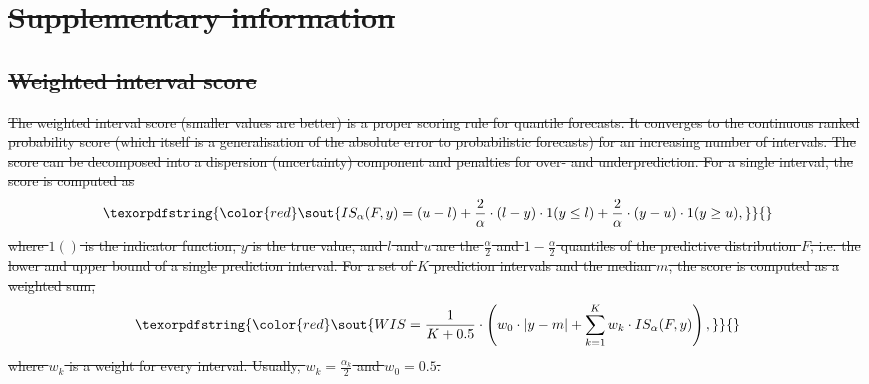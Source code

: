 \documentclass[10pt,a4paper,twocolumn]{article}
\providecommand{\DIFdeltex}[1]{{\protect\color{red}\sout{#1}}}                      %
\providecommand{\DIFdelbegin}{} %
\providecommand{\DIFdelend}{} %
\providecommand{\DIFdel}[1]{\texorpdfstring{\DIFdeltex{#1}}{}} %
\begin{document}
\section*{\DIFdel{Supplementary information}}
\DIFdelend %

\DIFdelbegin \subsection*{\DIFdel{Weighted interval score}}
\DIFdelend %


\DIFdelbegin \DIFdel{The weighted interval score (smaller values are better) is a proper scoring rule for quantile forecasts. It converges to the continuous ranked probability score (which itself is a generalisation of the absolute error to probabilistic forecasts) for an increasing number of intervals. The score can be decomposed into a dispersion (uncertainty) component and penalties for over- and underprediction. For a single interval, the score is computed as 
  }\begin{displaymath}\DIFdel{IS_\alpha(F,y) = (u-l) + \frac{2}{\alpha} \cdot (l-y) \cdot 1(y \leq l) + \frac{2}{\alpha} \cdot (y-u) \cdot 1(y \geq u), }\end{displaymath}%
\DIFdel{where $1()$ is the indicator function, $y$ is the true value, and $l$ and $u$ are the $\frac{\alpha}{2}$ and $1 - \frac{\alpha}{2}$ quantiles of the predictive distribution $F$, i.e. the lower and upper bound of a single prediction interval. For a set of $K$ prediction intervals and the median $m$, the score is computed as a weighted sum, 
  }\begin{displaymath}\DIFdel{WIS = \frac{1}{K + 0.5} \cdot \left( w_0 \cdot |y - m| + \sum_{k = 1}^{K} w_k \cdot IS_{\alpha}(F, y) \right), }\end{displaymath}%
\DIFdel{where $w_k$ is a weight for every interval. Usually, $w_k = \frac{\alpha_k}{2}$ and $w_0 = 0.5$. 
}\DIFdelend %
\end{document}
